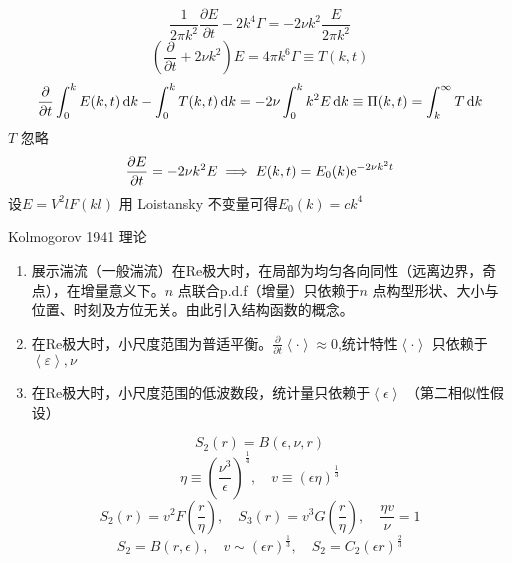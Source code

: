 \documentclass[12pt]{ctexart}
\begin{document}
\begin{equation}
   \frac{1}{2\pi k^2} \frac{\partial E}{\partial t}  - 2k^4 \Gamma = -2 \nu k^2 \frac{E}{2\pi k^2}
\end{equation}
\begin{equation}
   \left( \frac{\partial }{\partial t} + 2\nu k^2 \right) E = 4\pi k^6 \Gamma \equiv T(k,t) 
\end{equation}
\begin{equation}
   \frac{\partial }{\partial t} \int_0^k E(k,t) \dif k - \int_0^k T(k,t)\dif k = -2 \nu \int_0^k k^2 E \dif k \equiv \Pi(k,t) = \int_k^{\infty} T \dif k
\end{equation}
$T$ 忽略
\begin{equation}
   \frac{\partial E}{\partial t} = -2 \nu k^2 E \implies E(k,t) = E_0(k) \mathrm{e}^{-2\nu k^2t}
\end{equation}
设$E = V^2 l F(kl)$ 用 Loistansky 不变量可得$ E_0(k) = ck^4$

Kolmogorov 1941 理论

\begin{enumerate}
   \item 展示湍流（一般湍流）在Re极大时，在局部为均匀各向同性（远离边界，奇点），在增量意义下。$n$ 点联合p.d.f（增量）只依赖于$n$ 点构型形状、大小与位置、时刻及方位无关。由此引入结构函数的概念。
   \item 在Re极大时，小尺度范围为普适平衡。$ \frac{\partial }{\partial t} \left<\cdot \right> \approx 0$,统计特性$\left<\cdot \right>$ 只依赖于$\left<\varepsilon\right>,\nu$
   \item 在Re极大时，小尺度范围的低波数段，统计量只依赖于$\left<\epsilon \right>$ （第二相似性假设）
\end{enumerate}
\begin{equation}
   S_2(r) = B(\epsilon, \nu, r)
\end{equation}
\begin{equation}
   \eta \equiv \left( \frac{\nu^3}{\epsilon} \right) ^{\frac{1}{4}},\quad v \equiv (\epsilon \eta)^{\frac{1}{3}}
\end{equation}
\begin{equation}
   S_2(r) = v^2 F \left( \frac{r}{\eta} \right),\quad S_3(r) = v^3 G(\frac{r}{\eta}),\quad \frac{\eta v}{\nu} = 1
\end{equation}
\begin{equation}
   S_2 = B(r,\epsilon),\quad v \sim (\epsilon r)^{\frac{1}{3}},\quad S_2 = C_2 (\epsilon r)^{\frac{2}{3}}
\end{equation}












% 
\end{document}
